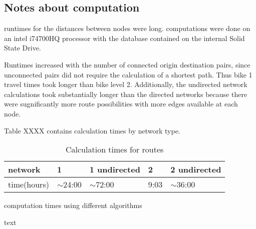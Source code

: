 \subsection{Notes about computation}

runtimes for the distances between nodes were long. computations were done on an intel i74700HQ processor with the database contained on the internal Solid State Drive. 

Runtimes increased with the number of connected origin destination pairs, since unconnected pairs  did not require the calculation of a shortest path. Thus bike 1 travel times took longer than bike level 2. Additionally, the undirected network calculations took substantially longer than the directed networks because there were sugnificantly more route possibilities with more edges available at each node. 

Table XXXX contains calculation times by network type. 



\begin{table}[]
\centering
\begin{tabular}{@{}l|llll@{}}
network     & 1           & 1 undirected & 2    & 2 undirected \\ \hline
time(hours) & $\sim$24:00 & $\sim$72:00  & 9:03 & $\sim$36:00 
\end{tabular}
\caption{Calculation times for routes}
\label{table:net_calc_times}
\end{table}

\begin{table}
\centering
\caption{computation times using different algorithms}
\label{table:comp_times_algo}
\end{table}


text